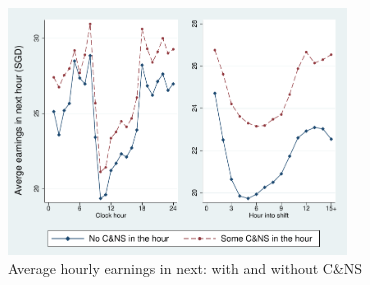 \documentclass[reviewmode]{restud}
\begin{document}
\begin{figure}
	{\centering
		\includegraphics[width=0.8\textwidth]{./fg/modelfree_earnings_vert.pdf}
		\caption{Average hourly earnings in next: with and without C\&NS}
		\label{fg:earningsbyhour}
	}
\end{figure}


\FloatBarrier
\end{document}
